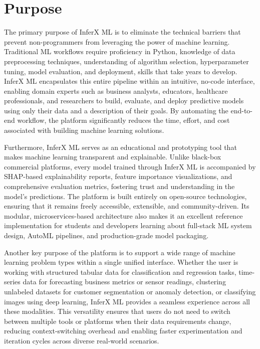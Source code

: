 \newpage
\section{Purpose}
\hspace{0.5cm}The primary purpose of InferX ML is to eliminate the technical barriers that prevent non-programmers from leveraging the power of machine learning. Traditional ML workflows require proficiency in Python, knowledge of data preprocessing techniques, understanding of algorithm selection, hyperparameter tuning, model evaluation, and deployment, skills that take years to develop. InferX ML encapsulates this entire pipeline within an intuitive, no-code interface, enabling domain experts such as business analysts, educators, healthcare professionals, and researchers to build, evaluate, and deploy predictive models using only their data and a description of their goals. By automating the end-to-end workflow, the platform significantly reduces the time, effort, and cost associated with building machine learning solutions.\vspace{0.3cm}

Furthermore, InferX ML serves as an educational and prototyping tool that makes machine learning transparent and explainable. Unlike black-box commercial platforms, every model trained through InferX ML is accompanied by SHAP-based explainability reports, feature importance visualizations, and comprehensive evaluation metrics, fostering trust and understanding in the model's predictions. The platform is built entirely on open-source technologies, ensuring that it remains freely accessible, extensible, and community-driven. Its modular, microservices-based architecture also makes it an excellent reference implementation for students and developers learning about full-stack ML system design, AutoML pipelines, and production-grade model packaging.\vspace{0.3cm}

Another key purpose of the platform is to support a wide range of machine learning problem types within a single unified interface. Whether the user is working with structured tabular data for classification and regression tasks, time-series data for forecasting business metrics or sensor readings, clustering unlabeled datasets for customer segmentation or anomaly detection, or classifying images using deep learning, InferX ML provides a seamless experience across all these modalities. This versatility ensures that users do not need to switch between multiple tools or platforms when their data requirements change, reducing context-switching overhead and enabling faster experimentation and iteration cycles across diverse real-world scenarios.\vspace{0.3cm}

